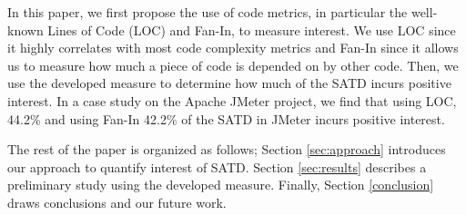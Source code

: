 In this paper, we first propose the use of code metrics, in particular the well-known Lines of Code (LOC) and Fan-In, to measure interest. We use LOC since it highly correlates with most code complexity metrics and Fan-In since it allows us to measure how much a piece of code is depended on by other code. Then, we use the developed measure to determine how much of the SATD incurs positive interest. In a case study on the Apache JMeter project, we find that using LOC, 44.2\% and using Fan-In 42.2\% of the SATD in JMeter incurs positive interest.

The rest of the paper is organized as follows; Section \ref{sec:approach} introduces our approach to quantify interest of SATD. Section \ref{sec:results} describes a preliminary study using the developed measure. Finally, Section \ref{conclusion} draws conclusions and our future work.
